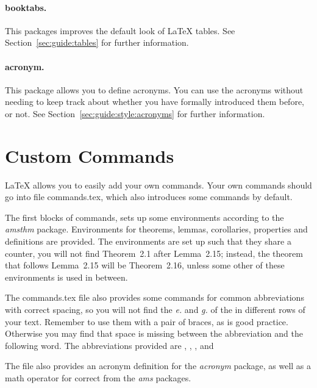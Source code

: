 \paragraph{booktabs.}
This packages improves the default look of \LaTeX{} tables.
See Section~\ref{sec:guide:tables} for further information.


\paragraph{acronym.}
This package allows you to define acronyms.
You can use the acronyms without needing to keep track about whether you have
formally introduced them before, or not.
See Section~\ref{sec:guide:style:acronyms} for further information.



\section{Custom Commands}
\label{sec:packages:commands}
\LaTeX{} allows you to easily add your own commands.
Your own commands should go into file \mbox{commands.tex}, which also
introduces some commands by default.

The first blocks of commands, sets up some environments according to the
\emph{amsthm} package.
Environments for theorems, lemmas, corollaries, properties and definitions are
provided.
The environments are set up such that they share a counter, \ie{} you will not
find Theorem~2.1 after Lemma~2.15; instead, the theorem that follows Lemma~2.15
will be Theorem~2.16, unless some other of these environments is used in
between. 

The \mbox{commands.tex} file also provides some commands for common
abbreviations with correct spacing, so you will not find the \emph{e.} and
\emph{g.} of the \eg{} in different rows of your text. 
Remember to use them with a pair of braces, as is good practice.
Otherwise you may find that space is missing between the abbreviation and the
following word.
The abbreviations provided are \eg{}, \ie{}, \cf{}, and \etal{}

The file also provides an acronym definition for the \emph{acronym} package, as
well as a math operator for correct from the \emph{ams} packages.
